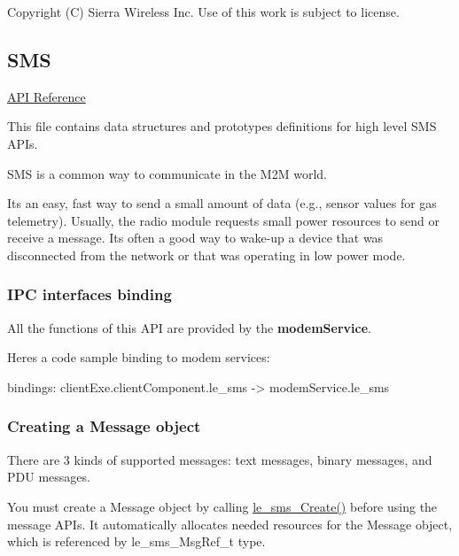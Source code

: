 Copyright (C) Sierra Wireless Inc. Use of this work is subject to license. \hypertarget{c_sms}{}\subsection{S\+M\+S}\label{c_sms}
\hyperlink{le__sms__interface_8h}{A\+P\+I Reference}





This file contains data structures and prototypes definitions for high level S\+M\+S A\+P\+Is.

S\+M\+S is a common way to communicate in the M2\+M world.

It\textquotesingle{}s an easy, fast way to send a small amount of data (e.\+g., sensor values for gas telemetry). Usually, the radio module requests small power resources to send or receive a message. It\textquotesingle{}s often a good way to wake-\/up a device that was disconnected from the network or that was operating in low power mode.\hypertarget{c_sms_le_sms_binding}{}\subsubsection{I\+P\+C interfaces binding}\label{c_sms_le_sms_binding}
All the functions of this A\+P\+I are provided by the {\bfseries modem\+Service}.

Here\textquotesingle{}s a code sample binding to modem services\+: \begin{DoxyVerb}bindings:
{
   clientExe.clientComponent.le_sms -> modemService.le_sms
}
\end{DoxyVerb}
\hypertarget{c_sms_le_sms_ops_creating_msg}{}\subsubsection{Creating a Message object}\label{c_sms_le_sms_ops_creating_msg}
There are 3 kinds of supported messages\+: text messages, binary messages, and P\+D\+U messages.

You must create a Message object by calling {\ttfamily \hyperlink{le__sms__interface_8h_a668abcbcff2f1f3c5cdf799315a81058}{le\+\_\+sms\+\_\+\+Create()}} before using the message A\+P\+Is. It automatically allocates needed resources for the Message object, which is referenced by {\ttfamily le\+\_\+sms\+\_\+\+Msg\+Ref\+\_\+t} type.


